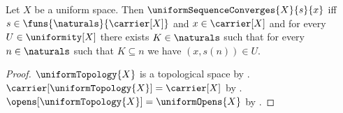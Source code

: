 \begin{theorem}\label{uniform_sequence_convergence_iff_entourages}
    Let $X$ be a uniform space.
    Then $\uniformSequenceConverges{X}{s}{x}$ iff
        $s\in\funs{\naturals}{\carrier[X]}$ and $x\in\carrier[X]$ and for
            every $U\in\uniformity[X]$ there exists $K\in\naturals$ such
            that for every $n\in\naturals$ such that $K\subseteq n$ we have
            $(x,s(n))\in U$.
\end{theorem}
\begin{proof}
    $\uniformTopology{X}$ is a topological space
        by .
    $\carrier[\uniformTopology{X}]=\carrier[X]$
        by .
    $\opens[\uniformTopology{X}]=\uniformOpens{X}$
        by .


\end{proof}
